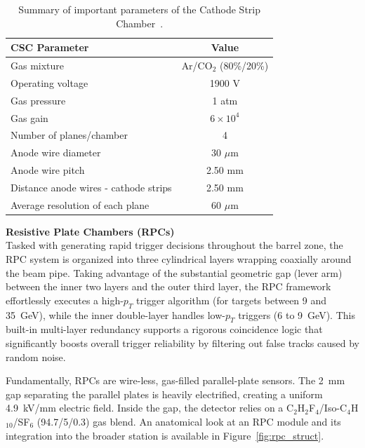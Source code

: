 \begin{table}[!htbp]
    \centering
    \begin{tabular}{l|c}
        \hline\hline
        \textbf{CSC Parameter} & \textbf{Value} \\
        \hline
        Gas mixture & Ar/CO$_2$ (80\%/20\%) \\
        Operating voltage & 1900 V \\
        Gas pressure & 1 atm \\
        Gas gain & $6\times10^4$ \\
        Number of planes/chamber & 4 \\
        Anode wire diameter & 30 $\mu$m \\
        Anode wire pitch & 2.50 mm \\
        Distance anode wires - cathode strips & 2.50 mm \\
        Average resolution of each plane & 60 $\mu$m \\
        \hline\hline
    \end{tabular}
    \caption{Summary of important parameters of the Cathode Strip Chamber~\cite{ATLAS-TDR-10,PERF-2007-01}.}
    \label{tab:summary_CSC}
\end{table}

\noindent\textbf{Resistive Plate Chambers (RPCs)} \\
Tasked with generating rapid trigger decisions throughout the barrel zone, the RPC system is organized into three cylindrical layers wrapping coaxially around the beam pipe. Taking advantage of the substantial geometric gap (lever arm) between the inner two layers and the outer third layer, the RPC framework effortlessly executes a high-$p_T$ trigger algorithm (for targets between 9 and 35~GeV), while the inner double-layer handles low-$p_T$ triggers (6 to 9~GeV). This built-in multi-layer redundancy supports a rigorous coincidence logic that significantly boosts overall trigger reliability by filtering out false tracks caused by random noise.

Fundamentally, RPCs are wire-less, gas-filled parallel-plate sensors. The 2~mm gap separating the parallel plates is heavily electrified, creating a uniform 4.9~kV/mm electric field. Inside the gap, the detector relies on a C$_2$H$_2$F$_4$/Iso-C$_4$H$_{10}$/SF$_6$ (94.7/5/0.3) gas blend. An anatomical look at an RPC module and its integration into the broader station is available in Figure~\ref{fig:rpc_struct}.

